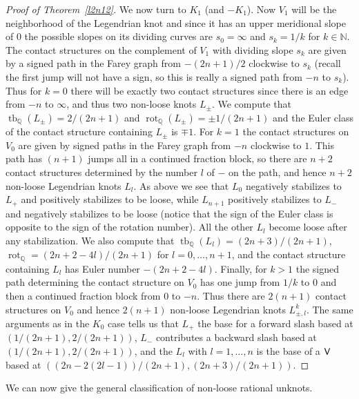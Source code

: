 \documentclass[11pt]{amsart}
\theoremstyle{plain}
\theoremstyle{definition}
\theoremstyle{remark}
\numberwithin{theorem}{section}
\newcommand{\Q}{\mathbb{Q}}           %
\newcommand{\N}{\mathbb{N}}           %
\DeclareMathOperator\tb{tb}                   %
\DeclareMathOperator\rot{rot}                 %
\begin{document}
\begin{proof}[Proof of Theorem~\ref{l2n12}]
We now turn to $K_1$ (and $-K_1$).  Now $V_1$ will be the neighborhood of the Legendrian knot and since it has an upper meridional slope of $0$ the possible slopes on its dividing curves are $s_0=\infty$ and $s_k=1/k$ for $k\in \N$. The contact structures on the complement of $V_1$ with dividing slope $s_k$ are given by a signed path in the Farey graph from $-(2n+1)/2$ clockwise to $s_k$ (recall the first jump will not have a sign, so this is really a signed path from $-n$ to $s_k$). Thus for $k=0$ there will be exactly two contact structures since there is an edge from $-n$ to $\infty$, and thus two non-loose knots $L_\pm$. We compute that $\tb_\Q(L_\pm)=2/(2n+1)$ and $\rot_\Q(L_\pm)=\pm 1/(2n+1)$ and the Euler class of the contact structure containing $L_{\pm}$ is $\mp1$.  For $k=1$ the contact structures on $V_0$ are given by signed paths in the Farey graph from $-n$ clockwise to $1$. This path has $(n+1)$ jumps all in a continued fraction block, so there are $n+2$ contact structures determined by the number $l$ of $-$ on the path, and hence $n+2$ non-loose Legendrian knots $L_l$. As above we see that $L_0$ negatively stabilizes to $L_+$  and positively stabilizes to be loose, while $L_{n+1}$ positively stabilizes to $L_-$ and negatively stabilizes to be loose (notice that the sign of the Euler class is opposite to the sign of the rotation number). All the other $L_l$ become loose after any stabilization. We also compute that $\tb_\Q(L_l)= (2n+3)/(2n+1)$, $\rot_\Q=(2n+2-4l)/(2n+1)$ for $l=0,\ldots,n+1$, and the contact structure containing $L_l$ has Euler number $-(2n+2-4l)$. Finally, for $k>1$ the signed path determining the contact structure on $V_0$ has one jump from $1/k$ to $0$ and then a continued fraction block from $0$ to $-n$.  Thus there are $2(n+1)$ contact structures on $V_0$ and hence $2(n+1)$ non-loose Legendrian knots $L^k_{\pm, l}$. The same arguments as in the $K_0$ case tells us that $L_+$ the base for a forward slash based at $(1/(2n+1),  2/(2n+1))$, $L_-$ contributes a backward slash based at $(1/(2n+1), 2/(2n+1))$, and the $L_l$ with $l=1, \ldots, n$ is the base of a $\normalfont\textsf{V}$ based at $((2n-2(2l-1))/(2n+1), (2n+3)/(2n+1))$. 
\end{proof}

We can now give the general classification of non-loose rational unknots. 
\end{document}
